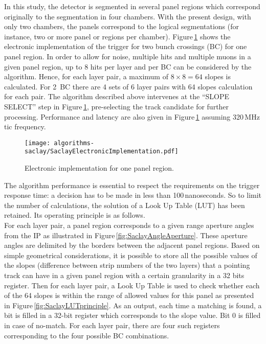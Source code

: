 In this study, the detector is segmented in several panel regions which correspond originally to the segmentation in four chambers. With the present design, with only two chambers, the panels correspond to the logical segmentations (for instance, two or more panel or regions per chamber).
Figure\,\ref{fig:SaclayElectronicImplementation} shows the electronic implementation of the trigger for two bunch crossings (BC) for one panel region.
In order to allow for noise, multiple hits and multiple muons in a given panel region, up to 8 hits per layer and per BC can be considered by the algorithm. Hence, for each layer pair, a maximum of $8\times 8=64$ slopes is calculated. For 2~BC there are 4 sets of 6 layer pairs with 64 slopes calculation for each pair.
The algorithm described above intervenes at the ``SLOPE SELECT'' step in Figure\,\ref{fig:SaclayElectronicImplementation}, pre-selecting the track candidate for further processing. Performance and latency are also given in Figure\,\ref{fig:SaclayElectronicImplementation} assuming 320\,MHz tic frequency.
 \begin{figure}[htb!]
  \begin{center}
  \texttt{[image: algorithms-saclay/SaclayElectronicImplementation.pdf]}
  \caption{Electronic implementation for one panel region.}
  \label{fig:SaclayElectronicImplementation}
  \end{center}
  \end{figure}
The algorithm performance is essential to respect the requirements on the trigger response time: a decision has to be made in less than 100\,nanoseconds. So to limit the number of calculations, the solution of a Look Up Table (LUT) has been retained. Its operating principle is as follows. \\
For each layer pair, a panel region  corresponds to a given range aperture angles from the IP as illustrated in Figure\,\ref{fig:SaclayAngleAperture}. These  aperture angles are delimited by the borders between the adjacent panel regions.
Based on simple geometrical considerations, it is possible to store all the possible values of the slopes (difference between strip numbers of the two layers) that a pointing track can have in a given panel region with a certain granularity in a 32 bits register.
Then for each layer pair, a Look Up Table is used to check  whether each of the 64 slopes is within the range of allowed values for this panel as presented in Figure\,\ref{fig:SaclayLUTprinciple}. As an output, each time a matching is found,  a bit  is filled in a 32-bit register which corresponds to the slope value.  Bit 0 is filled in case of no-match. For each layer pair, there are four such registers  corresponding to the four possible BC combinations. \\
